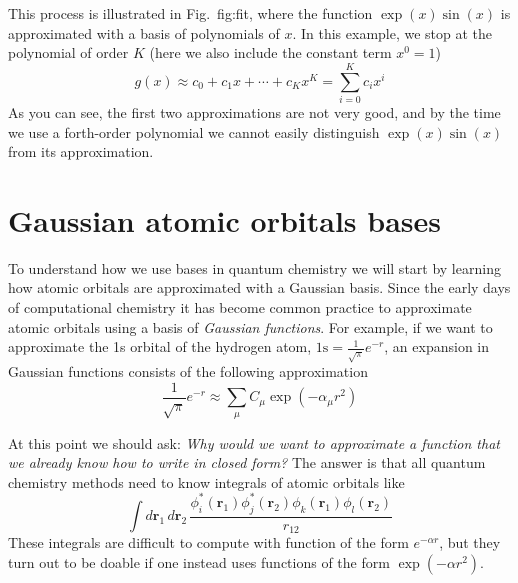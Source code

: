 \documentclass[../Main/chem371-notes.tex]{subfiles}
\begin{document}
This process is illustrated in Fig.~{fig:fit}, where the function $\exp(x) \sin(x)$ is approximated with a basis of polynomials of $x$.
In this example, we stop at the polynomial of order $K$ (here we also include the constant term $x^0 = 1$)
\begin{equation}
g(x) \approx  c_0 +  c_1 x + \cdots + c_K x^{K} = \sum_{i=0}^{K} c_i x^{i}
\end{equation}
As you can see, the first two approximations are not very good, and by the time we use a forth-order polynomial we cannot easily distinguish $\exp(x) \sin(x)$ from its approximation.

\section{Gaussian atomic orbitals bases}

To understand how we use bases in quantum chemistry we will start by learning how atomic orbitals are approximated with a Gaussian basis.
Since the early days of computational chemistry it has become common practice to approximate atomic orbitals using a basis of \emph{Gaussian functions}.
For example, if we want to approximate the 1s orbital of the hydrogen atom, $\mathrm{1s}=  \frac{1}{\sqrt{\pi}} e^{-r}$, an expansion in Gaussian functions consists of the following approximation
\begin{equation}
\frac{1}{\sqrt{\pi}} e^{-r} \approx \sum_\mu C_\mu \exp(- \alpha_\mu r^2)
\end{equation}

At this point we should ask: \emph{Why would we want to approximate a function that we already know how to write in closed form?}
The answer is that all quantum chemistry methods need to know integrals of atomic orbitals like
\begin{equation}
\int d\mathbf{r}_1 \, d\mathbf{r}_2 \, \frac{\phi^*_i(\mathbf{r}_1) \phi^*_j(\mathbf{r}_2) \phi_k(\mathbf{r}_1) \phi_l(\mathbf{r}_2)}{r_{12}}
\end{equation}
These integrals are difficult to compute with function of the form $e^{-\alpha r}$, but they turn out to be doable if one instead uses functions of the form $\exp(- \alpha r^2)$.
\end{document}
